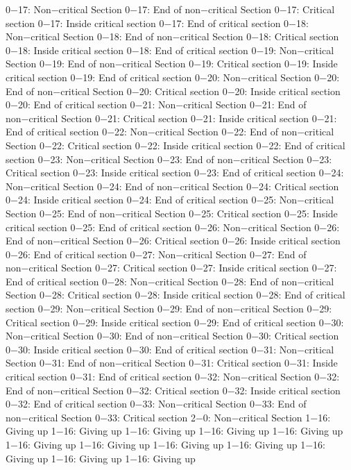 0−17: Non−critical Section
0−17: End of non−critical Section
0−17: Critical section
0−17: Inside critical section
0−17: End of critical section
0−18: Non−critical Section
0−18: End of non−critical Section
0−18: Critical section
0−18: Inside critical section
0−18: End of critical section
0−19: Non−critical Section
0−19: End of non−critical Section
0−19: Critical section
0−19: Inside critical section
0−19: End of critical section
0−20: Non−critical Section
0−20: End of non−critical Section
0−20: Critical section
0−20: Inside critical section
0−20: End of critical section
0−21: Non−critical Section
0−21: End of non−critical Section
0−21: Critical section
0−21: Inside critical section
0−21: End of critical section
0−22: Non−critical Section
0−22: End of non−critical Section
0−22: Critical section
0−22: Inside critical section
0−22: End of critical section
0−23: Non−critical Section
0−23: End of non−critical Section
0−23: Critical section
0−23: Inside critical section
0−23: End of critical section
0−24: Non−critical Section
0−24: End of non−critical Section
0−24: Critical section
0−24: Inside critical section
0−24: End of critical section
0−25: Non−critical Section
0−25: End of non−critical Section
0−25: Critical section
0−25: Inside critical section
0−25: End of critical section
0−26: Non−critical Section
0−26: End of non−critical Section
0−26: Critical section
0−26: Inside critical section
0−26: End of critical section
0−27: Non−critical Section
0−27: End of non−critical Section
0−27: Critical section
0−27: Inside critical section
0−27: End of critical section
0−28: Non−critical Section
0−28: End of non−critical Section
0−28: Critical section
0−28: Inside critical section
0−28: End of critical section
0−29: Non−critical Section
0−29: End of non−critical Section
0−29: Critical section
0−29: Inside critical section
0−29: End of critical section
0−30: Non−critical Section
0−30: End of non−critical Section
0−30: Critical section
0−30: Inside critical section
0−30: End of critical section
0−31: Non−critical Section
0−31: End of non−critical Section
0−31: Critical section
0−31: Inside critical section
0−31: End of critical section
0−32: Non−critical Section
0−32: End of non−critical Section
0−32: Critical section
0−32: Inside critical section
0−32: End of critical section
0−33: Non−critical Section
0−33: End of non−critical Section
0−33: Critical section
2−0: Non−critical Section
1−16: Giving up
1−16: Giving up
1−16: Giving up
1−16: Giving up
1−16: Giving up
1−16: Giving up
1−16: Giving up
1−16: Giving up
1−16: Giving up
1−16: Giving up
1−16: Giving up
1−16: Giving up
